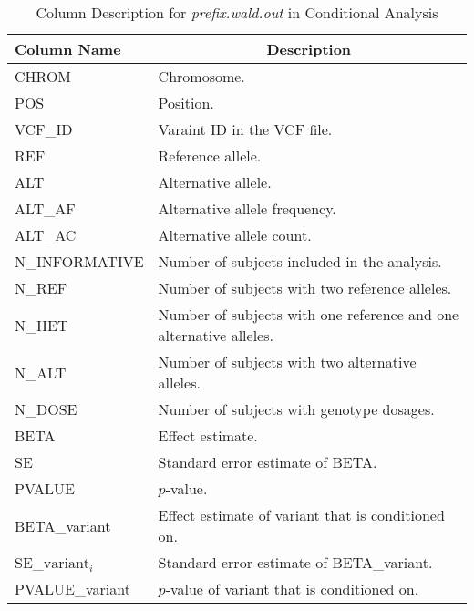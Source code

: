 \documentclass[12pt,letter]{article}
\begin{document}
\begin{table}[H]
\caption{Column Description for {\it prefix.wald.out} in Conditional Analysis}
\centering
\begin{tabular}{p{4cm}p{11cm}}
\hline\hline
\multicolumn{1}{l}{Column Name} & \multicolumn{1}{c}{Description} \\
\hline
{CHROM} & Chromosome. \\
{POS} & Position. \\
{VCF\_ID} & Varaint ID in the VCF file. \\
{REF} & Reference allele.\\
{ALT} & Alternative allele.\\
{ALT\_AF} & Alternative allele frequency.\\
{ALT\_AC} & Alternative allele count. \\
{N\_INFORMATIVE} & Number of subjects included in the analysis.\\
{N\_REF} & Number of subjects with two reference alleles.\\
{N\_HET} & Number of subjects with one reference and one alternative alleles.\\
{N\_ALT} & Number of subjects with two alternative alleles. \\
{N\_DOSE} & Number of subjects with genotype dosages. \\ 
{BETA} & Effect estimate. \\
{SE} & Standard error estimate of BETA. \\
{PVALUE} & $p$-value. \\
{BETA\_}{\ttfamily variant} & Effect estimate of {\ttfamily variant} that is conditioned on. \\
{SE\_}{\ttfamily $\text{variant}_{i}$} & Standard error estimate of BETA\_{\ttfamily variant}. \\
{PVALUE\_}{\ttfamily variant} & $p$-value of {\ttfamily variant} that is conditioned on. \\
\hline
\end{tabular}
\end{table}

\end{document}
